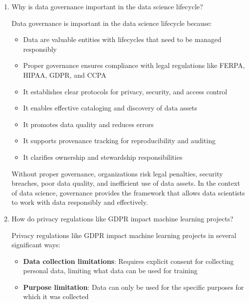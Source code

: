 \documentclass[12pt]{article}
\begin{document}
\begin{enumerate}
    \item Why is data governance important in the data science lifecycle?
    
    \begin{tcolorbox}[colback=blue!5!white,colframe=blue!75!black,title={Solution}]
    Data governance is important in the data science lifecycle because:
    
    \begin{itemize}
        \item Data are valuable entities with lifecycles that need to be managed responsibly
        \item Proper governance ensures compliance with legal regulations like FERPA, HIPAA, GDPR, and CCPA
        \item It establishes clear protocols for privacy, security, and access control
        \item It enables effective cataloging and discovery of data assets
        \item It promotes data quality and reduces errors
        \item It supports provenance tracking for reproducibility and auditing
        \item It clarifies ownership and stewardship responsibilities
    \end{itemize}
    
    Without proper governance, organizations risk legal penalties, security breaches, poor data quality, and inefficient use of data assets. In the context of data science, governance provides the framework that allows data scientists to work with data responsibly and effectively.
    \end{tcolorbox}
    
    \item How do privacy regulations like GDPR impact machine learning projects?
    
    \begin{tcolorbox}[colback=blue!5!white,colframe=blue!75!black,title={Solution}]
    Privacy regulations like GDPR impact machine learning projects in several significant ways:
    
    \begin{itemize}
        \item \textbf{Data collection limitations}: Requires explicit consent for collecting personal data, limiting what data can be used for training
        
        \item \textbf{Purpose limitation}: Data can only be used for the specific purposes for which it was collected
        

\end{itemize}
\end{tcolorbox}
\end{enumerate}
\end{document}
